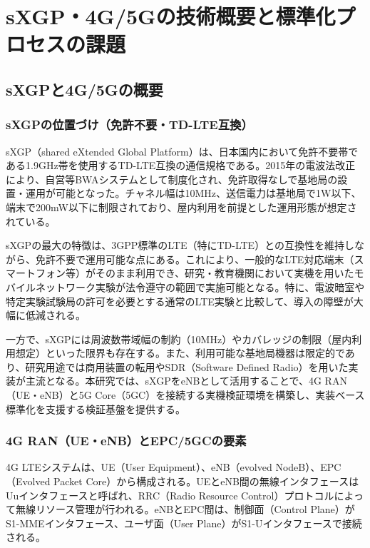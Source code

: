 \chapter{sXGP・4G/5Gの技術概要と標準化プロセスの課題}
\label{chap:background}

\section{sXGPと4G/5Gの概要}

\subsection{sXGPの位置づけ（免許不要・TD-LTE互換）}

sXGP（shared eXtended Global Platform）は、日本国内において免許不要帯である1.9GHz帯を使用するTD-LTE互換の通信規格である。2015年の電波法改正により、自営等BWAシステムとして制度化され、免許取得なしで基地局の設置・運用が可能となった。チャネル幅は10MHz、送信電力は基地局で1W以下、端末で200mW以下に制限されており、屋内利用を前提とした運用形態が想定されている。

sXGPの最大の特徴は、3GPP標準のLTE（特にTD-LTE）との互換性を維持しながら、免許不要で運用可能な点にある。これにより、一般的なLTE対応端末（スマートフォン等）がそのまま利用でき、研究・教育機関において実機を用いたモバイルネットワーク実験が法令遵守の範囲で実施可能となる。特に、電波暗室や特定実験試験局の許可を必要とする通常のLTE実験と比較して、導入の障壁が大幅に低減される。

一方で、sXGPには周波数帯域幅の制約（10MHz）やカバレッジの制限（屋内利用想定）といった限界も存在する。また、利用可能な基地局機器は限定的であり、研究用途では商用装置の転用やSDR（Software Defined Radio）を用いた実装が主流となる。本研究では、sXGPをeNBとして活用することで、4G RAN（UE・eNB）と5G Core（5GC）を接続する実機検証環境を構築し、実装ベース標準化を支援する検証基盤を提供する。

\subsection{4G RAN（UE・eNB）とEPC/5GCの要素}

4G LTEシステムは、UE（User Equipment）、eNB（evolved NodeB）、EPC（Evolved Packet Core）から構成される。UEとeNB間の無線インタフェースはUuインタフェースと呼ばれ、RRC（Radio Resource Control）プロトコルによって無線リソース管理が行われる。eNBとEPC間は、制御面（Control Plane）がS1-MMEインタフェース、ユーザ面（User Plane）がS1-Uインタフェースで接続される。

